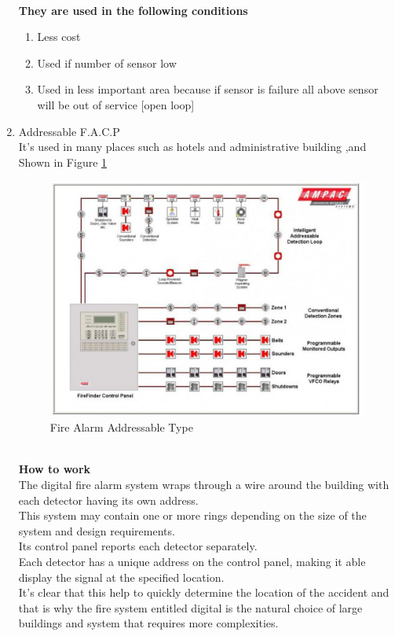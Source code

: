 \documentclass[12pt,fleqn]{book} %
\begin{document}
\begin{enumerate}
\\ \textbf{They are used in the following conditions}
\begin{enumerate}
    \item Less cost
    \item Used if number of sensor low
    \item Used in less important area because if sensor is failure all above sensor will be out of service [open loop]
\end{enumerate}
    \item Addressable F.A.C.P
  \\  It's used in many places such as hotels and administrative building ,and Shown in Figure \ref{fig:hamdy 46}
    \begin{figure}[!h]
    \centering
    \includegraphics[width=0.9\linewidth]{hamdy 46.png}
    \caption{Fire Alarm Addressable Type}
    \label{fig:hamdy 46}
    \end{figure}
   \\ \textbf{How to work}
   \\ The digital fire alarm system wraps through a wire around the building with each detector having its own address.
   \\ This system may contain one or more rings depending on the size of the system and design requirements.
   \\ Its control panel reports each detector separately.
   \\ Each detector has a unique address on the control panel, making it able display the signal at the specified location.
   \\ It's clear that this help to quickly determine the location of the accident and that is why the fire system entitled digital is the natural choice of large buildings and system that requires more complexities.
\end{enumerate}
\end{document}
